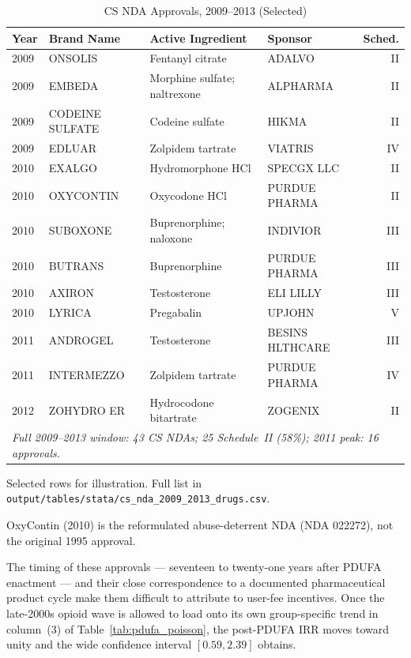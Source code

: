 \begin{table}[htbp]
\centering
\begin{threeparttable}
\caption{CS NDA Approvals, 2009--2013 (Selected)}
\label{tab:spike_drugs}
\small
\begin{tabular}{llllr}
\toprule
Year & Brand Name & Active Ingredient & Sponsor & Sched. \\
\midrule
2009 & ONSOLIS & Fentanyl citrate & ADALVO & II \\
2009 & EMBEDA & Morphine sulfate; naltrexone & ALPHARMA & II \\
2009 & CODEINE SULFATE & Codeine sulfate & HIKMA & II \\
2009 & EDLUAR & Zolpidem tartrate & VIATRIS & IV \\
2010 & EXALGO & Hydromorphone HCl & SPECGX LLC & II \\
2010 & OXYCONTIN & Oxycodone HCl & PURDUE PHARMA & II \\
2010 & SUBOXONE & Buprenorphine; naloxone & INDIVIOR & III \\
2010 & BUTRANS & Buprenorphine & PURDUE PHARMA & III \\
2010 & AXIRON & Testosterone & ELI LILLY & III \\
2010 & LYRICA & Pregabalin & UPJOHN & V \\
2011 & ANDROGEL & Testosterone & BESINS HLTHCARE & III \\
2011 & INTERMEZZO & Zolpidem tartrate & PURDUE PHARMA & IV \\
2012 & ZOHYDRO ER & Hydrocodone bitartrate & ZOGENIX & II \\
\midrule
\multicolumn{5}{l}{\textit{Full 2009--2013 window: 43 CS NDAs; 25 Schedule~II (58\%); 2011 peak: 16 approvals.}} \\
\bottomrule
\end{tabular}
\begin{tablenotes}
\footnotesize
\item Selected rows for illustration. Full list in \texttt{output/tables/stata/cs\_nda\_2009\_2013\_drugs.csv}.
\item OxyContin (2010) is the reformulated abuse-deterrent NDA (NDA 022272), not the original 1995 approval.
\end{tablenotes}
\end{threeparttable}
\end{table}

The timing of these approvals --- seventeen to twenty-one years after PDUFA enactment --- and their close correspondence to a documented pharmaceutical product cycle make them difficult to attribute to user-fee incentives. Once the late-2000s opioid wave is allowed to load onto its own group-specific trend in column~(3) of Table~\ref{tab:pdufa_poisson}, the post-PDUFA IRR moves toward unity and the wide confidence interval $[0.59, 2.39]$ obtains.

